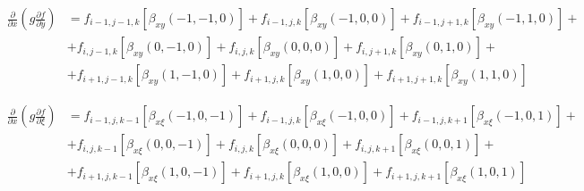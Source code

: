 \begin{equation*}
    \begin{split}
        \frac
            {\partial}
            {\partial x}
        \left(
            g
            \frac
                {\partial f}
                {\partial y}
        \right)
        &
        =
        f_{i-1, j-1, k}
        \left[
            \beta_{xy} \left(-1, -1, 0\right)
        \right]
        +
        f_{i-1, j, k}
        \left[
            \beta_{xy} \left(-1, 0, 0\right)
        \right]
        +
        f_{i-1, j+1, k}
        \left[
            \beta_{xy} \left(-1, 1, 0\right)
        \right]
        +
        \\
        &
        +
        f_{i, j-1, k}
        \left[
            \beta_{xy} \left(0,-1, 0\right)
        \right]
        +
        f_{i, j, k}
        \left[
            \beta_{xy} \left(0, 0, 0\right)
        \right]
        +
        f_{i, j+1, k}
        \left[
            \beta_{xy} \left(0, 1, 0\right)
        \right]
        +
        \\
        &
        +
        f_{i+1, j-1, k}
        \left[
            \beta_{xy} \left(1, -1, 0\right)
        \right]
        +
        f_{i+1, j, k}
        \left[
            \beta_{xy} \left(1, 0, 0\right)
        \right]
        +
        f_{i+1, j+1, k}
        \left[
            \beta_{xy} \left(1, 1, 0\right)
        \right]
    \end{split}
\end{equation*}

\begin{equation*}
    \begin{split}
        \frac
            {\partial}
            {\partial x}
        \left(
            g
            \frac
                {\partial f}
                {\partial \xi}
        \right)
        &
        =
        f_{i-1, j, k-1}
        \left[
            \beta_{x\xi} \left(-1, 0, -1\right)
        \right]
        +
        f_{i-1, j, k}
        \left[
            \beta_{x\xi} \left(-1, 0, 0\right)
        \right]
        +
        f_{i-1, j, k+1}
        \left[
            \beta_{x\xi} \left(-1, 0, 1\right)
        \right]
        +
        \\
        &
        +
        f_{i, j, k-1}
        \left[
            \beta_{x\xi} \left(0, 0, -1\right)
        \right]
        +
        f_{i, j, k}
        \left[
            \beta_{x\xi} \left(0, 0, 0\right)
        \right]
        +
        f_{i, j, k+1}
        \left[
            \beta_{x\xi} \left(0, 0, 1\right)
        \right]
        +
        \\
        &
        +
        f_{i+1, j, k-1}
        \left[
            \beta_{x\xi} \left(1, 0, -1\right)
        \right]
        +
        f_{i+1, j, k}
        \left[
            \beta_{x\xi} \left(1, 0, 0\right)
        \right]
        +
        f_{i+1, j, k+1}
        \left[
            \beta_{x\xi} \left(1, 0, 1\right)
        \right]
    \end{split}
\end{equation*}

